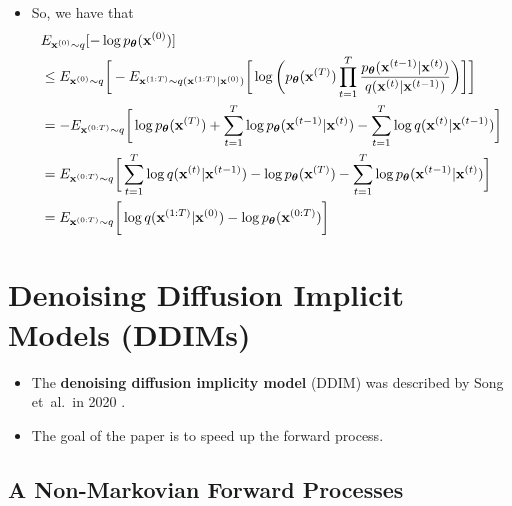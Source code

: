 \documentclass[10pt]{article}
\newcommand{\ve}[1]{\mathbf{#1}}
\newcommand{\ves}[1]{\boldsymbol{#1}}
\newcommand{\etal}{{et~al.}}
\begin{document}
\begin{itemize}
  \item So, we have that
  \begin{align}    
    &E_{\ve{x}^{(0)} \sim q} [-\log p_{\ves{\theta}}(\ve{x}^{(0)})] \notag \\
    &\leq E_{\ve{x}^{(0)} \sim q} \bigg[ - E_{\ve{x}^{(1:T)} \sim q(\ve{x}^{(1:T)}|\ve{x}^{(0)})} \bigg[ \log \bigg( p_{\ves{\theta}}(\ve{x}^{(T)}) \prod_{t=1}^T \frac{ p_{\ves{\theta}}(\ve{x}^{(t-1)}|\ve{x}^{(t)})}{ q(\ve{x}^{(t)}|\ve{x}^{(t-1)})} \bigg) \bigg] \bigg] \notag \\
    &= - E_{\ve{x}^{(0:T)}\sim q}\bigg[ \log p_{\ves{\theta}}(\ve{x}^{(T)}) + \sum_{t=1}^T \log p_{\ves{\theta}}(\ve{x}^{(t-1)}|\ve{x}^{(t)}) - \sum_{t=1}^T \log q(\ve{x}^{(t)}|\ve{x}^{(t-1)}) \bigg] \notag \\
    &= E_{\ve{x}^{(0:T)}\sim q}\bigg[ \sum_{t=1}^T \log q(\ve{x}^{(t)}|\ve{x}^{(t-1)}) - \log p_{\ves{\theta}}(\ve{x}^{(T)}) - \sum_{t=1}^T \log p_{\ves{\theta}}(\ve{x}^{(t-1)}|\ve{x}^{(t)}) \bigg] \notag \\
    &= E_{\ve{x}^{(0:T)} \sim q}\bigg[ \log q(\ve{x}^{(1:T)}|\ve{x}^{(0)}) - \log p_{\ves{\theta}}(\ve{x}^{(0:T)}) \bigg] \label{ddpm-elbo}
  \end{align}
\end{itemize}

\section{Denoising Diffusion Implicit Models (DDIMs)}

\begin{itemize}
  \item The {\bf denoising diffusion implicity model} (DDIM) was described by Song \etal\ in 2020 \cite{Song:2020}.
  
  \item The goal of the paper is to speed up the forward process.
\end{itemize}

\subsection{A Non-Markovian Forward Processes}
\end{document}
